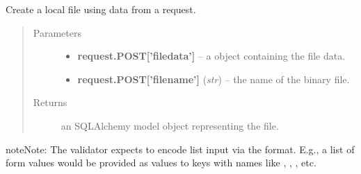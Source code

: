 \documentclass[letterpaper,10pt,english]{sphinxmanual}
\begin{document}
\begin{fulllineitems}
\label{api:onlinelinguisticdatabase.controllers.files.createPlainFile}
Create a local file using data from a  request.
\begin{quote}\begin{description}
\item[{Parameters}] \leavevmode\begin{itemize}
\item {} 
\textbf{request.POST{[}'filedata'{]}} -- a  object containing
the file data.

\item {} 
\textbf{request.POST{[}'filename'{]}} (\emph{str}) -- the name of the binary file.

\end{itemize}

\item[{Returns}] \leavevmode
an SQLAlchemy model object representing the file.

\end{description}\end{quote}

\begin{notice}{note}{Note:}
The validator expects  to encode list input via the
 format.  E.g., a list of
form  values would be provided as values to keys with names like
, , , etc.
\end{notice}

\end{fulllineitems}

\end{document}
